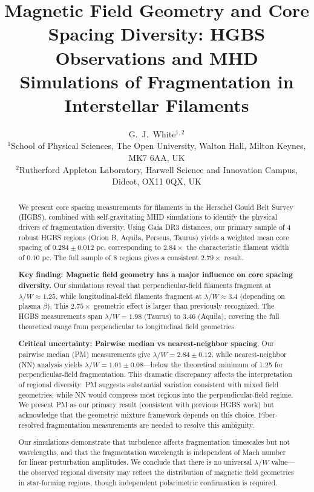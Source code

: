 \documentclass[twoside,twocolumn]{mnras}
\title{Magnetic Field Geometry and Core Spacing Diversity: HGBS Observations and MHD Simulations of Fragmentation in Interstellar Filaments}
\author[G.~J.~White]{G.~J.~White$^{1,2}$\\
$^{1}$School of Physical Sciences, The Open University, Walton Hall, Milton Keynes, MK7 6AA, UK\\
$^{2}$Rutherford Appleton Laboratory, Harwell Science and Innovation Campus, Didcot, OX11 0QX, UK}
\begin{document}
\maketitle

\begin{abstract}
We present core spacing measurements for filaments in the Herschel Gould Belt Survey (HGBS), combined with self-gravitating MHD simulations to identify the physical drivers of fragmentation diversity. Using Gaia DR3 distances, our primary sample of 4 robust HGBS regions (Orion B, Aquila, Perseus, Taurus) yields a weighted mean core spacing of $0.284 \pm 0.012$ pc, corresponding to $2.84\times$ the characteristic filament width of $0.10$ pc. The full sample of 8 regions gives a consistent $2.79\times$ result.

\textbf{Key finding: Magnetic field geometry has a major influence on core spacing diversity.} Our simulations reveal that perpendicular-field filaments fragment at $\lambda/W \approx 1.25$, while longitudinal-field filaments fragment at $\lambda/W \approx 3.4$ (depending on plasma $\beta$). This $2.75\times$ geometric effect is larger than previously recognized. The HGBS measurements span $\lambda/W = 1.98$ (Taurus) to $3.46$ (Aquila), covering the full theoretical range from perpendicular to longitudinal field geometries.

\textbf{Critical uncertainty: Pairwise median vs nearest-neighbor spacing}. Our pairwise median (PM) measurements give $\lambda/W = 2.84 \pm 0.12$, while nearest-neighbor (NN) analysis yields $\lambda/W = 1.01 \pm 0.08$---below the theoretical minimum of 1.25 for perpendicular-field fragmentation. This dramatic discrepancy affects the interpretation of regional diversity: PM suggests substantial variation consistent with mixed field geometries, while NN would compress most regions into the perpendicular-field regime. We present PM as our primary result (consistent with previous HGBS work) but acknowledge that the geometric mixture framework depends on this choice. Fiber-resolved fragmentation measurements are needed to resolve this ambiguity.

Our simulations demonstrate that turbulence affects fragmentation timescales but not wavelengths, and that the fragmentation wavelength is independent of Mach number for linear perturbation amplitudes. We conclude that there is no universal $\lambda/W$ value---the observed regional diversity may reflect the distribution of magnetic field geometries in star-forming regions, though independent polarimetric confirmation is required.
\end{abstract}
\end{document}
